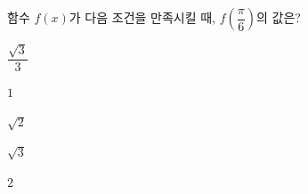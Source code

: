 함수 $f(x)$가 다음 조건을 만족시킬 때, $f\left(\dfrac{\pi}{6}\right)$의 값은?  
\begin{choices32}{\rule[-3ex]{0pt}{8ex}$\dfrac{\sqrt{3}}{3}$}{\rule[-3ex]{0pt}{8ex}$1$}{\rule[-3ex]{0pt}{8ex}$\sqrt{2}$}{\rule[-3ex]{0pt}{8ex}$\sqrt{3}$}{\rule[-3ex]{0pt}{8ex}$2$}\end{choices32}
